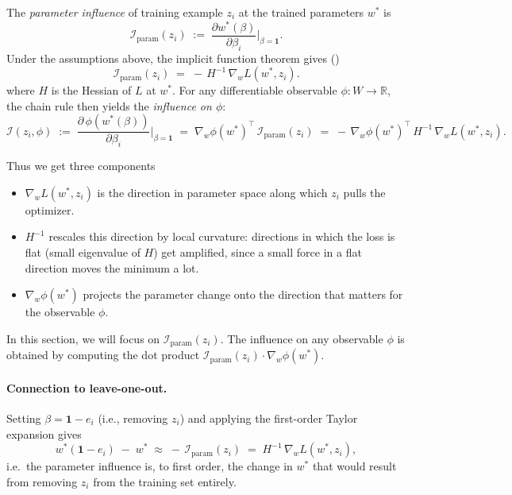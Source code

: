 \documentclass[11pt]{article}
\begin{document}
\begin{definition}\label{def:if}
The \emph{parameter influence} of training example $z_i$ at the trained parameters $w^*$ is
\[
  \mathcal{I}_{\mathrm{param}}(z_i) \;:=\; \frac{\partial w^*(\beta)}{\partial \beta_i}\bigg\rvert_{\beta=\mathbf{1}}.
\]
Under the assumptions above, the implicit function theorem gives ()
\[
  \boxed{\;\mathcal{I}_{\mathrm{param}}(z_i) \;=\; -\,H^{-1}\,\nabla_w L(w^*,z_i).\;}
\]
where $H$ is the Hessian of $L$ at $w^*$.
For any differentiable observable $\phi:W\to\mathbb{R}$, the chain rule then yields the \emph{influence on $\phi$}:
\[
  \mathcal{I}(z_i,\phi) \;:=\; \frac{\partial\,\phi(w^*(\beta))}{\partial \beta_i}\bigg\rvert_{\beta=\mathbf{1}} \;=\; \nabla_w \phi(w^*)^\top\,\mathcal{I}_{\mathrm{param}}(z_i) \;=\; -\,\nabla_w \phi(w^*)^\top\,H^{-1}\,\nabla_w L(w^*,z_i).
\]
\end{definition}

Thus we get three components
\begin{itemize}
  \item $\nabla_w L(w^*,z_i)$ is the direction in parameter space along which $z_i$ pulls the optimizer.
  \item $H^{-1}$ rescales this direction by local curvature: directions in which the loss is flat (small eigenvalue of $H$) get amplified, since a small force in a flat direction moves the minimum a lot.
  \item $\nabla_w \phi(w^*)$ projects the parameter change onto the direction that matters for the observable $\phi$.
\end{itemize}
In this section, we will focus on $\mathcal{I}_{\mathrm{param}}(z_i)$. The influence on any observable $\phi$ is obtained by computing the dot product $\mathcal{I}_{\mathrm{param}}(z_i) \cdot \nabla_w\phi(w^*)$.

\paragraph{Connection to leave-one-out.} Setting $\beta = \mathbf{1} - e_i$ (i.e., removing $z_i$) and applying the first-order Taylor expansion gives
\begin{equation}
  w^*(\mathbf{1} - e_i) \;-\; w^* \;\approx\; -\,\mathcal{I}_{\mathrm{param}}(z_i) \;=\; H^{-1}\,\nabla_w L(w^*,z_i),
  \label{eq:loo-approx}
\end{equation}
i.e.\ the parameter influence is, to first order, the change in $w^*$ that would result from removing $z_i$ from the training set entirely. 
\end{document}
